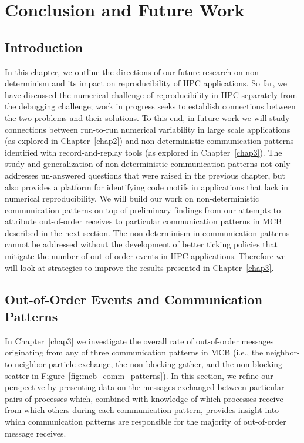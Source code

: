 \chapter{Conclusion and Future Work} \label{chap4}

\section{Introduction}

In this chapter, we outline the directions of our future research on
non-determinism and its impact on reproducibility of HPC applications.
So far, we have discussed the numerical challenge of reproducibility
in HPC separately from the debugging challenge; work in progress seeks
to establish connections between the two problems and their
solutions. To this end, in future work we will study connections
between run-to-run numerical variability in large scale applications
(as explored in Chapter~\ref{chap2}) and non-deterministic
communication patterns identified with record-and-replay tools (as
explored in Chapter~\ref{chap3}). The study and generalization of
non-deterministic communication patterns not only addresses
un-answered questions that were raised in the previous chapter, but
also provides a platform for identifying code motifs in applications
that lack in numerical reproducibility. We will build our work on
non-deterministic communication patterns on top of preliminary
findings from our attempts to attribute out-of-order receives to
particular communication patterns in MCB described in the next
section. The non-determinism in communication patterns cannot be
addressed without the development of better ticking policies that
mitigate the number of out-of-order events in HPC
applications. Therefore we will look at strategies to improve the
results presented in Chapter~\ref{chap3}.

\section{Out-of-Order Events and Communication Patterns}

In Chapter~\ref{chap3} we investigate the overall rate of out-of-order
messages originating from any of three communication patterns in MCB
(i.e., the neighbor-to-neighbor particle exchange, the non-blocking
gather, and the non-blocking scatter in
Figure~\ref{fig:mcb_comm_patterns}). In this section, we refine our
perspective by presenting data on the messages exchanged between
particular pairs of processes which, combined with knowledge of which
processes receive from which others during each communication pattern,
provides insight into which communication patterns are responsible for
the majority of out-of-order message receives.

